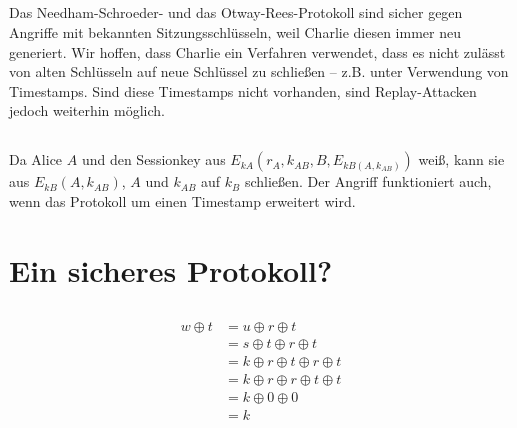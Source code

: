 \documentclass{../crypto}
\begin{document}

\subsection{}

Das Needham-Schroeder- und das Otway-Rees-Protokoll sind sicher gegen Angriffe
mit bekannten Sitzungsschlüsseln, weil Charlie diesen immer neu generiert. Wir
hoffen, dass Charlie ein Verfahren verwendet, dass es nicht zulässt von alten
Schlüsseln auf neue Schlüssel zu schließen -- z.B.  unter Verwendung von
Timestamps. Sind diese Timestamps nicht vorhanden, sind Replay-Attacken jedoch
weiterhin möglich.


\subsection{}

Da Alice $A$ und den Sessionkey aus $E_{kA}(r_A,k_{AB},B,E_{kB(A,k_{AB})})$
weiß, kann sie aus $E_{kB}(A,k_{AB})$, $A$ und $k_{AB}$ auf $k_B$ schließen. Der
Angriff funktioniert auch, wenn das Protokoll um einen Timestamp erweitert wird.

\section{Ein sicheres Protokoll?}
\subsection{}
\begin{align*}
	w \oplus t & = u \oplus r \oplus t                   \\
	           & = s \oplus t \oplus r \oplus t          \\
	           & = k \oplus r \oplus t \oplus r \oplus t \\
	           & = k \oplus r \oplus r \oplus t \oplus t \\
	           & = k \oplus 0 \oplus 0                   \\
	           & = k
\end{align*}
\end{document}
